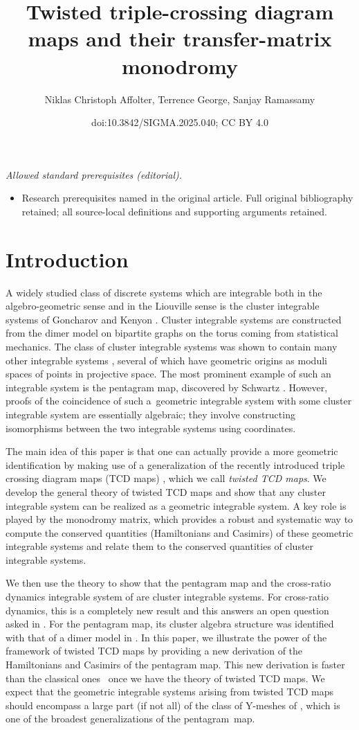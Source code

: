 \documentclass[10pt,a4paper]{amsart}
\title{Twisted triple-crossing diagram maps and their transfer-matrix monodromy}
\author{Niklas Christoph Affolter, Terrence George, Sanjay Ramassamy}
\date{doi:10.3842/SIGMA.2025.040; CC BY 4.0}
\numberwithin{equation}{section}
\begin{document}
\maketitle
\noindent\textit{Allowed standard prerequisites (editorial).}\begin{itemize}
\item Research prerequisites named in the original article. Full original bibliography retained; all source-local definitions and supporting arguments retained.
\end{itemize}\medskip
\section{Introduction}
	
A widely studied class of discrete systems which are integrable both in the algebro-geometric sense and in the Liouville sense is the cluster integrable systems of Goncharov and Kenyon \cite{GK13}. Cluster integrable systems are constructed from the dimer model on bipartite graphs on the torus coming from statistical mechanics. The class of cluster integrable systems was shown to contain many other integrable systems \cite{FM16}, several of which have geometric origins as moduli spaces of points in projective space. The most prominent example of such an integrable system is the pentagram map, discovered by Schwartz \cite{Schwartz1}. However, proofs of the coincidence of such a~geometric integrable system with some cluster integrable system are essentially algebraic; they involve constructing isomorphisms between the two integrable systems using coordinates.
	
	The main idea of this paper is that one can actually provide a more geometric identification by making use of a generalization of the recently introduced triple crossing diagram maps (TCD maps) \cite{AGPR,AGR}, which we call \textit{twisted TCD maps}. We develop the general theory of twisted TCD maps and show that any cluster integrable system can be realized as a geometric integrable system. A key role is played by the monodromy matrix, which provides a robust and systematic way to compute the conserved quantities (Hamiltonians and Casimirs) of these geometric integrable systems and relate them to the conserved quantities of cluster integrable systems.
	
	We then use the theory to show that the pentagram map and the cross-ratio dynamics integrable system of \cite{AFIT} are cluster integrable systems. For cross-ratio dynamics, this is a completely new result and this answers an open question asked in \cite{AFIT}. For the pentagram map, its cluster algebra structure was identified with that of a dimer model in \cite{AGPR}. In this paper, we illustrate the power of the framework of twisted TCD maps by providing a new derivation of the Hamiltonians and Casimirs of the pentagram map. This new derivation is faster than the classical ones~\mbox{\cite{OST1,Soloviev}} once we have the theory of twisted TCD maps. We expect that the geometric integrable systems arising from twisted TCD maps should encompass a large part (if not all) of the class of Y-meshes of \cite{GP}, which is one of the broadest generalizations of the pentagram~map.
	
\end{document}
